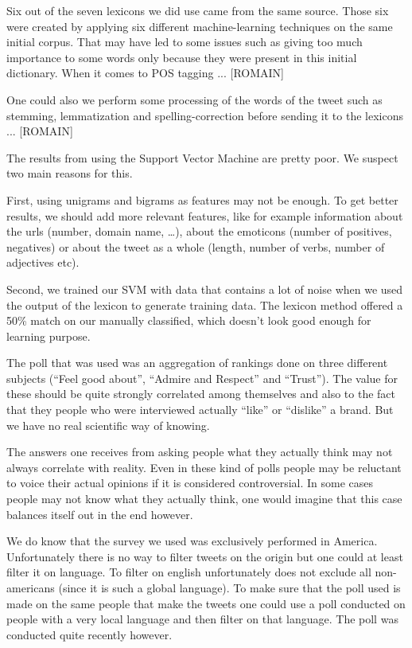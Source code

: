 \documentclass[a4paper,12pt]{report}
\begin{document}
Six out of the seven lexicons we did use came from the same source. Those six were created by applying six different machine-learning techniques on the same initial corpus. That may have led to some issues such as giving too much importance to some words only because they were present in this initial dictionary. When it comes to POS tagging ... [ROMAIN]

One could also we perform some processing of the words of the tweet such as stemming, lemmatization and spelling-correction before sending it to the lexicons ... [ROMAIN]

The results from using the Support Vector Machine are pretty poor. We suspect two main reasons for this.

First, using unigrams and bigrams as features may not be enough. To get better results, we should add more relevant features, like for example information about the urls (number, domain name, …), about the emoticons (number of positives, negatives) or about the tweet as a whole (length, number of verbs, number of adjectives etc).

Second, we trained our SVM with data that contains a lot of noise when we used the output of the lexicon to generate training data. The lexicon method offered a 50\% match on our manually classified, which doesn’t look good enough for learning purpose.

The poll that was used was an aggregation of rankings done on three different subjects (“Feel good about”, “Admire and Respect” and “Trust”). The value for these should be quite strongly correlated among themselves and also to the fact that they people who were interviewed actually “like” or “dislike” a brand. But we have no real scientific way of knowing.

The answers one receives from asking people what they actually think may not always correlate with reality. Even in these kind of polls people may be reluctant to voice their actual opinions if it is considered controversial. In some cases people may not know what they actually think, one would imagine that this case balances itself out in the end however.

We do know that the survey we used was exclusively performed in America. Unfortunately there is no way to filter tweets on the origin but one could at least filter it on language. To filter on english unfortunately does not exclude all non-americans (since it is such a global language). To make sure that the poll used is made on the same people that make the tweets one could use a poll conducted on people with a very local language and then filter on that language. The poll was conducted quite recently however.
\end{document}
